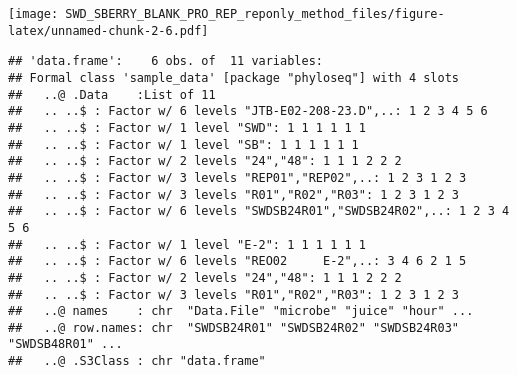 \documentclass[]{article}
\newenvironment{Shaded}{\begin{snugshade}}{\end{snugshade}}
\newcommand{\KeywordTok}[1]{\textcolor[rgb]{0.13,0.29,0.53}{\textbf{#1}}}
\newcommand{\StringTok}[1]{\textcolor[rgb]{0.31,0.60,0.02}{#1}}
\newcommand{\CommentTok}[1]{\textcolor[rgb]{0.56,0.35,0.01}{\textit{#1}}}
\newcommand{\OperatorTok}[1]{\textcolor[rgb]{0.81,0.36,0.00}{\textbf{#1}}}
\newcommand{\NormalTok}[1]{#1}
\begin{document}
\texttt{[image: SWD\_SBERRY\_BLANK\_PRO\_REP\_reponly\_method\_files/figure-latex/unnamed-chunk-2-6.pdf]}

\begin{Shaded}
\end{Shaded}

\begin{verbatim}
## 'data.frame':    6 obs. of  11 variables:
## Formal class 'sample_data' [package "phyloseq"] with 4 slots
##   ..@ .Data    :List of 11
##   .. ..$ : Factor w/ 6 levels "JTB-E02-208-23.D",..: 1 2 3 4 5 6
##   .. ..$ : Factor w/ 1 level "SWD": 1 1 1 1 1 1
##   .. ..$ : Factor w/ 1 level "SB": 1 1 1 1 1 1
##   .. ..$ : Factor w/ 2 levels "24","48": 1 1 1 2 2 2
##   .. ..$ : Factor w/ 3 levels "REP01","REP02",..: 1 2 3 1 2 3
##   .. ..$ : Factor w/ 3 levels "R01","R02","R03": 1 2 3 1 2 3
##   .. ..$ : Factor w/ 6 levels "SWDSB24R01","SWDSB24R02",..: 1 2 3 4 5 6
##   .. ..$ : Factor w/ 1 level "E-2": 1 1 1 1 1 1
##   .. ..$ : Factor w/ 6 levels "REO02     E-2",..: 3 4 6 2 1 5
##   .. ..$ : Factor w/ 2 levels "24","48": 1 1 1 2 2 2
##   .. ..$ : Factor w/ 3 levels "R01","R02","R03": 1 2 3 1 2 3
##   ..@ names    : chr  "Data.File" "microbe" "juice" "hour" ...
##   ..@ row.names: chr  "SWDSB24R01" "SWDSB24R02" "SWDSB24R03" "SWDSB48R01" ...
##   ..@ .S3Class : chr "data.frame"
\end{verbatim}

\begin{Shaded}
\end{Shaded}
\end{document}
